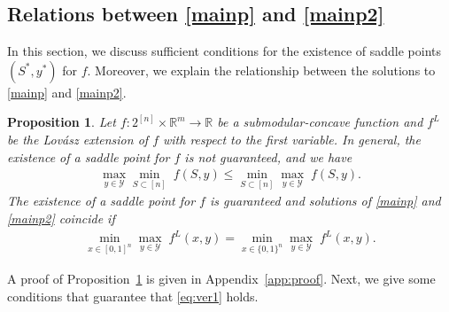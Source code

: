 \documentclass{article}
\theoremstyle{plain}
\newtheorem{proposition}[theorem]{Proposition}
\theoremstyle{definition}
\theoremstyle{remark}
\newcommand{\R}{\mathbb{R}}
\begin{document}
\subsection{Relations between \eqref{mainp} %
and \eqref{mainp2}}
In this section, we discuss sufficient conditions for the existence of saddle points $(S^\ast,y^\ast)$ for $f.$ Moreover, we explain the relationship between the solutions to \eqref{mainp} %
and \eqref{mainp2}. 
\begin{proposition}\label{prp:ngs}
    Let $f:2^{[n]}\times\R^m\rightarrow \mathbb{R}$ be a submodular-concave function and $f^L$ be the Lovász extension of $f$ with respect to the first variable. In general, the existence of a saddle point for $f$ is not guaranteed, and we have
    \begin{align}
\underset{y \in \mathcal{Y}}{\max}\underset{S \subset [n] }{\min}\;f(S,y)\leq\underset{S \subset [n]}{\min}\underset{y \in \mathcal{Y}}{\max}\;f(S,y). \label{eq:max_min_leq1}
\end{align}
The existence of a saddle point for $f$ is guaranteed and solutions of \eqref{mainp} %
and \eqref{mainp2} coincide if 
\begin{align}\label{eq:ver1}
    \underset{x \in [0,1]^n}{\min}\underset{y \in \mathcal{Y}}{\max}\;f^L(x,y)=\underset{x \in \{0,1\}^n}{\min}\underset{y \in \mathcal{Y}}{\max}\;f^L(x,y).
\end{align}
\end{proposition}
A proof of Proposition~\ref{prp:ngs} is given in Appendix~\ref{app:proof}.
Next, we give some conditions that guarantee that \eqref{eq:ver1} holds. 
\end{document}
